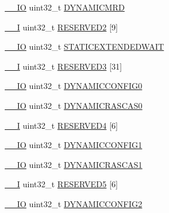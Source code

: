 \begin{DoxyCompactItemize}
\hyperlink{core__sc300_8h_aec43007d9998a0a0e01faede4133d6be}{\+\_\+\+\_\+\+IO} uint32\+\_\+t \hyperlink{struct_l_p_c___e_m_c___t_a2d7465a21e7ebb5330c9a415f0fa7095}{D\+Y\+N\+A\+M\+I\+C\+M\+RD}
\item 
\hyperlink{core__sc300_8h_af63697ed9952cc71e1225efe205f6cd3}{\+\_\+\+\_\+I} uint32\+\_\+t \hyperlink{struct_l_p_c___e_m_c___t_a6af6e341458c43fc628e3e3a7e0f2da2}{R\+E\+S\+E\+R\+V\+E\+D2} \mbox{[}9\mbox{]}
\item 
\hyperlink{core__sc300_8h_aec43007d9998a0a0e01faede4133d6be}{\+\_\+\+\_\+\+IO} uint32\+\_\+t \hyperlink{struct_l_p_c___e_m_c___t_a165975a224bd75738ff2235a915b50a5}{S\+T\+A\+T\+I\+C\+E\+X\+T\+E\+N\+D\+E\+D\+W\+A\+IT}
\item 
\hyperlink{core__sc300_8h_af63697ed9952cc71e1225efe205f6cd3}{\+\_\+\+\_\+I} uint32\+\_\+t \hyperlink{struct_l_p_c___e_m_c___t_a7c6a6967c293e69662a50b67a488a553}{R\+E\+S\+E\+R\+V\+E\+D3} \mbox{[}31\mbox{]}
\item 
\hyperlink{core__sc300_8h_aec43007d9998a0a0e01faede4133d6be}{\+\_\+\+\_\+\+IO} uint32\+\_\+t \hyperlink{struct_l_p_c___e_m_c___t_ac9aabbb1bebb557abeb76ea06a7ac1e9}{D\+Y\+N\+A\+M\+I\+C\+C\+O\+N\+F\+I\+G0}
\item 
\hyperlink{core__sc300_8h_aec43007d9998a0a0e01faede4133d6be}{\+\_\+\+\_\+\+IO} uint32\+\_\+t \hyperlink{struct_l_p_c___e_m_c___t_a4104ed21b80e0298ce3d5eaa83ea33c8}{D\+Y\+N\+A\+M\+I\+C\+R\+A\+S\+C\+A\+S0}
\item 
\hyperlink{core__sc300_8h_af63697ed9952cc71e1225efe205f6cd3}{\+\_\+\+\_\+I} uint32\+\_\+t \hyperlink{struct_l_p_c___e_m_c___t_a7087c562c5c06da8fcf4f89ea1f99610}{R\+E\+S\+E\+R\+V\+E\+D4} \mbox{[}6\mbox{]}
\item 
\hyperlink{core__sc300_8h_aec43007d9998a0a0e01faede4133d6be}{\+\_\+\+\_\+\+IO} uint32\+\_\+t \hyperlink{struct_l_p_c___e_m_c___t_a9470d9d98030389e5b67cb29cdc683f8}{D\+Y\+N\+A\+M\+I\+C\+C\+O\+N\+F\+I\+G1}
\item 
\hyperlink{core__sc300_8h_aec43007d9998a0a0e01faede4133d6be}{\+\_\+\+\_\+\+IO} uint32\+\_\+t \hyperlink{struct_l_p_c___e_m_c___t_aa94607ecd569d4363fab430430467c74}{D\+Y\+N\+A\+M\+I\+C\+R\+A\+S\+C\+A\+S1}
\item 
\hyperlink{core__sc300_8h_af63697ed9952cc71e1225efe205f6cd3}{\+\_\+\+\_\+I} uint32\+\_\+t \hyperlink{struct_l_p_c___e_m_c___t_a9aa884a748395df91283b9c9eb02f6e4}{R\+E\+S\+E\+R\+V\+E\+D5} \mbox{[}6\mbox{]}
\item 
\hyperlink{core__sc300_8h_aec43007d9998a0a0e01faede4133d6be}{\+\_\+\+\_\+\+IO} uint32\+\_\+t \hyperlink{struct_l_p_c___e_m_c___t_a2ab88241f0fec992cd45f1417f17f3e0}{D\+Y\+N\+A\+M\+I\+C\+C\+O\+N\+F\+I\+G2}

\end{DoxyCompactItemize}
